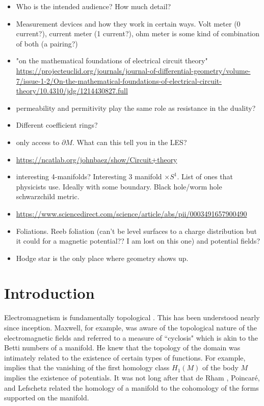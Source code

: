 \documentclass{article}
\begin{document}
\begin{itemize}
    \item Who is the intended audience? How much detail? 
    \item Measurement devices and how they work in certain ways. Volt meter (0 current?), current meter (1 current?), ohm meter is some kind of combination of both (a pairing?)
    \item "on the mathematical foundations of electrical circuit theory"  \url{https://projecteuclid.org/journals/journal-of-differential-geometry/volume-7/issue-1-2/On-the-mathematical-foundations-of-electrical-circuit-theory/10.4310/jdg/1214430827.full}
    \item permeability and permitivity play the same role as resistance in the duality?
    \item Different coefficient rings?
    \item only access to $\partial M$. What can this tell you in the LES?
    \item \url{https://ncatlab.org/johnbaez/show/Circuit+theory}
    \item interesting 4-manifolds? Interesting 3 manifold $\times S^1$. List of ones that physicists use. Ideally with some boundary. Black hole/worm hole schwarzchild metric.
    \item \url{https://www.sciencedirect.com/science/article/abs/pii/0003491657900490}
    \item Foliations. Reeb foliation (can't be level surfaces to a charge distribution but it could for a magnetic potential?? I am lost on this one) and potential fields?
    \item Hodge star is the only place where geometry shows up.
\end{itemize}

\tableofcontents

\section{Introduction}
Electromagnetism is fundamentally topological \cite{gross_electromagnetic_2004}. 
This has been understood nearly since inception. 
Maxwell, for example, was aware of the topological nature of the electromagnetic fields and referred to a measure of ``cyclosis" which is akin to the Betti numbers of a manifold. 
He knew that the topology of the domain was intimately related to the existence of certain types of functions.
 For example, \cite[theorem 1]{maxwell_treatise_1873} implies that the vanishing of the first homology class $H_1(M)$ of the body $M$ implies the existence of potentials. 
 It was not long after that de Rham , Poincar\'e, and Lefschetz related the homology of a manifold to the cohomology of the forms supported on the manifold.
\end{document}
